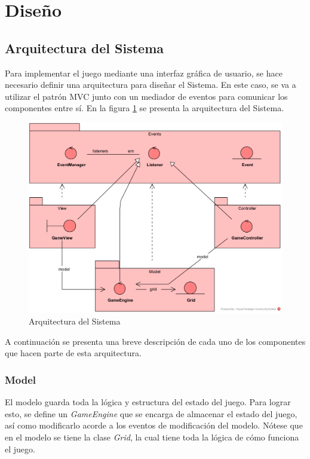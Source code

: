 \documentclass[letter,12pt]{article}
\begin{document}
\section{Diseño} \label{diseño}

\subsection{Arquitectura del Sistema} \label{diseño:arquitectura}

Para implementar el juego mediante una interfaz gráfica de usuario, se hace necesario definir una arquitectura para diseñar el Sistema. En este caso, se va a utilizar el patrón MVC junto con un mediador de eventos para comunicar los componentes entre sí. En la figura \ref{fig:arquitectura} se presenta la arquitectura del Sistema. \par

\begin{figure}[ht!]
	\centering
	\includegraphics[scale=0.6]{img/mvc.png}
	\caption{Arquitectura del Sistema}
	\label{fig:arquitectura}
\end{figure}

A continuación se presenta una breve descripción de cada uno de los componentes que hacen parte de esta arquitectura.

\subsubsection{Model} \label{diseño:arquitectura:model}

El modelo guarda toda la lógica y estructura del estado del juego. Para lograr esto, se define un \textit{GameEngine} que se encarga de almacenar el estado del juego, así como modificarlo acorde a los eventos de modificación del modelo. Nótese que en el modelo se tiene la clase \textit{Grid}, la cual tiene toda la lógica de cómo funciona el juego. \par
\end{document}
